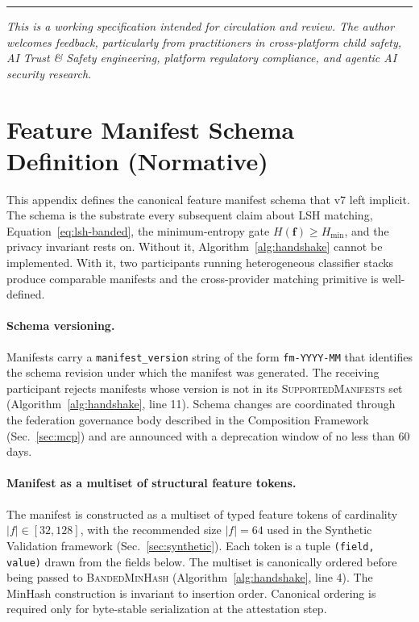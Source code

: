 \documentclass[11pt]{article}
\begin{document}
\vspace{1em}
\hrule
\vspace{0.5em}
\noindent\small\emph{This is a working specification intended for circulation and review. The author welcomes feedback, particularly from practitioners in cross-platform child safety, AI Trust \& Safety engineering, platform regulatory compliance, and agentic AI security research.}

\appendix
\section{Feature Manifest Schema Definition (Normative)}
\label{app:manifest}

This appendix defines the canonical feature manifest schema that v7 left implicit. The schema is the substrate every subsequent claim about LSH matching, Equation~\eqref{eq:lsh-banded}, the minimum-entropy gate $H(\mathbf{f}) \geq H_{\min}$, and the privacy invariant rests on. Without it, Algorithm~\ref{alg:handshake} cannot be implemented. With it, two participants running heterogeneous classifier stacks produce comparable manifests and the cross-provider matching primitive is well-defined.

\paragraph{Schema versioning.} Manifests carry a \texttt{manifest\_version} string of the form \texttt{fm-YYYY-MM} that identifies the schema revision under which the manifest was generated. The receiving participant rejects manifests whose version is not in its \textsc{SupportedManifests} set (Algorithm~\ref{alg:handshake}, line 11). Schema changes are coordinated through the federation governance body described in the Composition Framework (Sec.~\ref{sec:mcp}) and are announced with a deprecation window of no less than 60 days.

\paragraph{Manifest as a multiset of structural feature tokens.} The manifest is constructed as a multiset of typed feature tokens of cardinality $|f| \in [32, 128]$, with the recommended size $|f| = 64$ used in the Synthetic Validation framework (Sec.~\ref{sec:synthetic}). Each token is a tuple \texttt{(field, value)} drawn from the fields below. The multiset is canonically ordered before being passed to \textsc{BandedMinHash} (Algorithm~\ref{alg:handshake}, line 4). The MinHash construction is invariant to insertion order. Canonical ordering is required only for byte-stable serialization at the attestation step.
\end{document}
